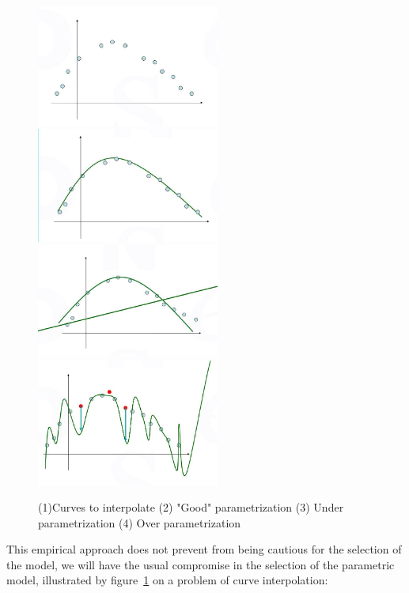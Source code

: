 \begin{figure}
\centering
\includegraphics[width=6cm]{Methods/Images/Courbe-Pts.jpg}
\includegraphics[width=6cm]{Methods/Images/CourbeGoodParam.jpg}\\
\includegraphics[width=6cm]{Methods/Images/Courbe-UndeParam.jpg}
\includegraphics[width=6cm]{Methods/Images/CourbeOverParam.jpg}
	\caption{(1)Curves to interpolate (2) "Good" parametrization (3) Under parametrization (4) Over parametrization}
	\label{fig:CurvesParam}
\end{figure}


This empirical approach does not prevent from being cautious
for the selection of the model, we will have the usual compromise in the selection
of the parametric model, illustrated by figure~\ref{fig:CurvesParam}  on a problem of curve interpolation:



